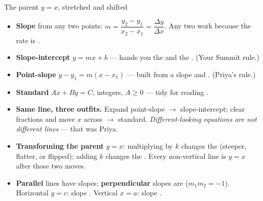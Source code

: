 \documentclass[12pt]{article}
\newcommand{\lgrid}[4]{%
  \draw[step=1, linegray!40, very thin] (#1,#3) grid (#2,#4);
  \draw[->, semithick, charcoal] (#1,0)--(#2,0) node[below right, font=\scriptsize]{$x$};
  \draw[->, semithick, charcoal] (0,#3)--(0,#4) node[left, font=\scriptsize]{$y$};}
\begin{document}
\boxguard[14]
\begin{tcolorbox}[enhanced, colback=sky, colframe=navy, boxrule=0.8pt, arc=2mm,
    left=3mm, right=3mm, top=1.5mm, bottom=1.5mm, breakable,
    fonttitle=\bfseries\small\color{white}, title={QuickNotes: Three Ways to Write One Line},
    attach boxed title to top left={yshift=-2mm, xshift=4mm},
    boxed title style={colback=navy, colframe=navy, arc=1.5mm}]
\small
\begin{minipage}[t]{0.30\linewidth}
\vspace{2pt}\centering
{}\\[1pt]
{\footnotesize The parent $y=x$, stretched and shifted}
\end{minipage}\hfill
\begin{minipage}[t]{0.66\linewidth}
\vspace{0pt}
\begin{itemize}[leftmargin=1.1em, itemsep=2pt, topsep=0pt]
  \item \textbf{Slope} from any two points: $m = \dfrac{y_2-y_1}{x_2-x_1} = \dfrac{\Delta y}{\Delta x}$.
        Any two work because the rate is \blank{1.8cm}.
  \item \textbf{Slope-intercept} $y = mx+b$ --- hands you the \blank{1.4cm} and the
        \blank{2.2cm}. (Your Summit rule.)
  \item \textbf{Point-slope} $y - y_1 = m(x - x_1)$ --- built from a slope and
        \blank{2.6cm}. (Priya's rule.)
  \item \textbf{Standard} $Ax + By = C$, integers, $A \ge 0$ --- tidy for reading
        \blank{2.0cm}.
\end{itemize}
\end{minipage}

\vspace{3pt}
\begin{itemize}[leftmargin=1.1em, itemsep=2pt, topsep=0pt]
  \item \textbf{Same line, three outfits.} Expand point-slope $\to$ slope-intercept; clear fractions
        and move $x$ across $\to$ standard. \emph{Different-looking equations are not different
        lines} --- that was Priya.
  \item \textbf{Transforming the parent} $y = x$: multiplying by $k$ changes the
        \blank{1.6cm} (steeper, flatter, or flipped); adding $k$ changes the
        \blank{2.4cm}. Every non-vertical line is $y=x$ after those two moves.
  \item \textbf{Parallel} lines have \blank{1.8cm} slopes; \textbf{perpendicular} slopes are
        \blank{3.0cm} ($m_1m_2 = -1$). \; Horizontal $y=c$: slope
        \blank{1.0cm}. \; Vertical $x=a$: slope \blank{1.8cm}.
\end{itemize}
\end{tcolorbox}
\end{document}
